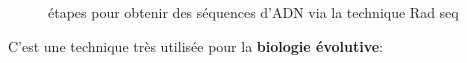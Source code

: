 \documentclass[a4paper,11pt,twoside]{report}
\begin{document}
\begin{figure}[!ht]
\caption{étapes pour obtenir des séquences d'ADN via la technique Rad seq}
\end{figure}

C'est une technique très utilisée pour la \textbf{biologie évolutive}:
\end{document}
